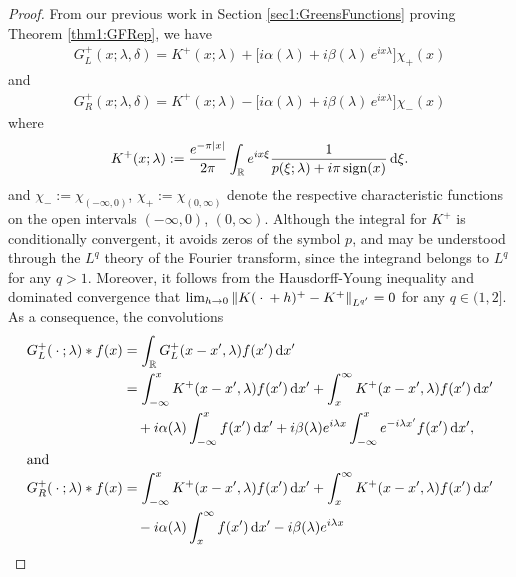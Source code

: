 \documentclass[../dissertation]{subfiles}
\begin{document}
\begin{proof}
	From our previous work in Section 
	\ref{sec1:GreensFunctions} proving Theorem \ref{thm1:GFRep}, we have
	\begin{align}
		G_L^+(x; \lambda, \delta) 
			= 
				K^+(x; \lambda) 
				+ 
					\big[
						i \alpha(\lambda) + i \beta(\lambda)\, e^{ix\lambda} 
					\big] \chi_+(x)
	\end{align}
	and
	\begin{align}
		G_R^+(x; \lambda, \delta) 
			= 
				K^+(x; \lambda) 
				- 
					\big[
						i \alpha(\lambda) + i \beta(\lambda)\, e^{ix\lambda} 
					\big] \chi_-(x)
	\end{align}
	where 
	\begin{align*}
		K^+(x; \lambda) 
				:= \frac{e^{-\pi |x|}}{2\pi} 
					\int_{\mathbb R} e^{i x \xi} 
						\frac{1}{p(\xi; \lambda) + i \pi \sign(x)}
					\, \mathrm{d}\xi.
	\end{align*}
	and $\chi_-:= \chi_{(-\infty, 0)}$, $\chi_+:= \chi_{(0, \infty)}$ denote 
	the respective characteristic functions on the open intervals 
	$(-\infty, 0)$, $(0, \infty)$. 
	Although the integral for $K^+$ is conditionally convergent, it avoids 
	zeros of the symbol $p$, and may be understood through the $L^q$ theory 
	of the Fourier transform, since the integrand belongs to $L^q$ for any 
	$q>1$.  Moreover, it follows from the 
	Hausdorf{}f-Young inequality and dominated convergence that 
	$\lim_{h \to 0} \norm[L^{q'}]{K(\dotarg+h)^+ - K^+} =0$ for any $q \in (1,2]$. 
	As a consequence, the convolutions
	\begin{align}
		\label{ILW.GL*f}
		G_L^+(\dotarg; \lambda) * f(x) 	
			&=	\int_{\mathbb R} G_L^+(x-x',\lambda) f(x') \, \mathrm{d}x' 	\\
			&=	
				\int_{-\infty}^x K^+(x-x',\lambda) f(x') \, \mathrm{d}x'
				+\int_x^{\infty} K^+(x-x',\lambda) f(x') \, \mathrm{d}x'
				\nonumber \\
			&\quad 	+ i \alpha (\lambda) \int_{-\infty}^x f(x') \, \mathrm{d}x' 
				+ i \beta(\lambda) e^{i\lam x} 
						\int_{-\infty}^x e^{-i\lambda x'} f(x') \, \mathrm{d}x', 
				\nonumber\\
		\intertext{and}
		\label{ILW.GR*f}
		G_R^+(\dotarg; \lambda) * f(x) 
			&= 
				\int_{-\infty}^x K^+(x-x',\lambda) f(x') \, \mathrm{d}x'
				+\int_x^{\infty} K^+(x-x',\lambda) f(x') \, \mathrm{d}x'
				\\
			&\quad- i \alpha (\lambda) \int_x^{\infty} f(x') \, \mathrm{d}x' 
				- i \beta(\lambda) e^{i\lam x} 

\end{align}
\end{proof}
\end{document}

